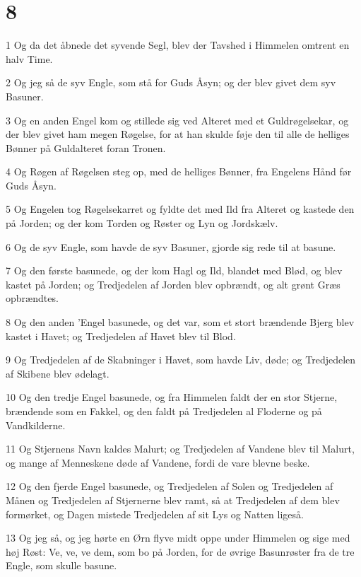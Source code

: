 \chapter{8}

\par 1 Og da det åbnede det syvende Segl, blev der Tavshed i Himmelen omtrent en halv Time.
\par 2 Og jeg så de syv Engle, som stå for Guds Åsyn; og der blev givet dem syv Basuner.
\par 3 Og en anden Engel kom og stillede sig ved Alteret med et Guldrøgelsekar, og der blev givet ham megen Røgelse, for at han skulde føje den til alle de helliges Bønner på Guldalteret foran Tronen.
\par 4 Og Røgen af Røgelsen steg op, med de helliges Bønner, fra Engelens Hånd før Guds Åsyn.
\par 5 Og Engelen tog Røgelsekarret og fyldte det med Ild fra Alteret og kastede den på Jorden; og der kom Torden og Røster og Lyn og Jordskælv.
\par 6 Og de syv Engle, som havde de syv Basuner, gjorde sig rede til at basune.
\par 7 Og den første basunede, og der kom Hagl og Ild, blandet med Blød, og blev kastet på Jorden; og Tredjedelen af Jorden blev opbrændt, og alt grønt Græs opbrændtes.
\par 8 Og den anden 'Engel basunede, og det var, som et stort brændende Bjerg blev kastet i Havet; og Tredjedelen af Havet blev til Blod.
\par 9 Og Tredjedelen af de Skabninger i Havet, som havde Liv, døde; og Tredjedelen af Skibene blev ødelagt.
\par 10 Og den tredje Engel basunede, og fra Himmelen faldt der en stor Stjerne, brændende som en Fakkel, og den faldt på Tredjedelen al Floderne og på Vandkilderne.
\par 11 Og Stjernens Navn kaldes Malurt; og Tredjedelen af Vandene blev til Malurt, og mange af Menneskene døde af Vandene, fordi de vare blevne beske.
\par 12 Og den fjerde Engel basunede, og Tredjedelen af Solen og Tredjedelen af Månen og Tredjedelen af Stjernerne blev ramt, så at Tredjedelen af dem blev formørket, og Dagen mistede Tredjedelen af sit Lys og Natten ligeså.
\par 13 Og jeg så, og jeg hørte en Ørn flyve midt oppe under Himmelen og sige med høj Røst: Ve, ve, ve dem, som bo på Jorden, for de øvrige Basunrøster fra de tre Engle, som skulle basune.


